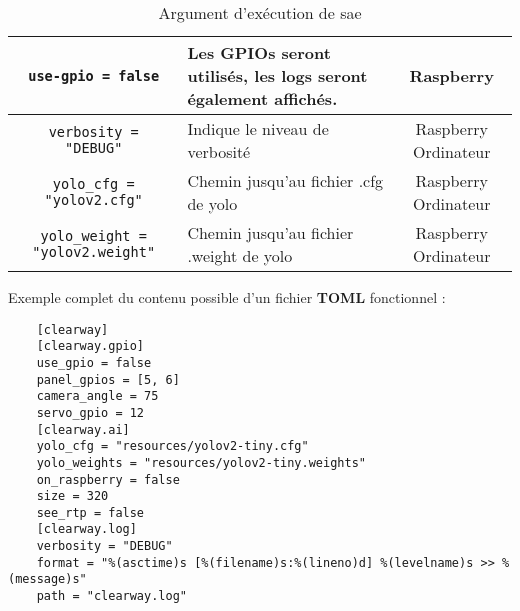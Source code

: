 \begin{table}[H]
\begin{tabularx}{\linewidth}{|c|X|c|}
        \texttt{use-gpio = false}                    & Les GPIOs seront utilisés, les logs seront également affichés.                                                                                                    & Raspberry               \\\hline
        \texttt{verbosity = "DEBUG"}                 & Indique le niveau de verbosité                                                                                                                                    & Raspberry Ordinateur    \\\hline
        \texttt{yolo\_cfg = "yolov2.cfg"}            & Chemin jusqu'au fichier .cfg de yolo                                                                                                                              & Raspberry Ordinateur    \\\hline
        \texttt{yolo\_weight = "yolov2.weight"}      & Chemin jusqu'au fichier .weight de yolo                                                                                                                           & Raspberry Ordinateur    \\\hline
    \end{tabularx}
    \label{tab:tomlClearway}
    \caption{Argument d'exécution de \gls{sae}}
\end{table}

Exemple complet du contenu possible d'un fichier \textbf{TOML} fonctionnel :

\begin{verbatim}
    [clearway]
    [clearway.gpio]
    use_gpio = false
    panel_gpios = [5, 6]
    camera_angle = 75
    servo_gpio = 12
    [clearway.ai]
    yolo_cfg = "resources/yolov2-tiny.cfg"
    yolo_weights = "resources/yolov2-tiny.weights"
    on_raspberry = false
    size = 320
    see_rtp = false
    [clearway.log]
    verbosity = "DEBUG"
    format = "%(asctime)s [%(filename)s:%(lineno)d] %(levelname)s >> %(message)s"
    path = "clearway.log"
\end{verbatim}